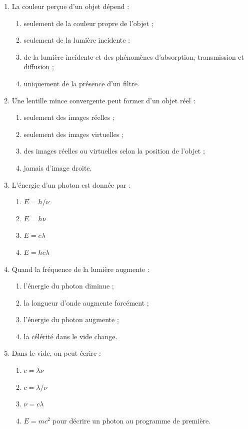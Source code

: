 \documentclass[11pt,a4paper]{article}
\begin{document}
\begin{enumerate}[label=\textbf{Q\arabic*.},leftmargin=1.1cm]
\item La couleur perçue d'un objet dépend :
\begin{enumerate}[label=\alph*)]
    \item seulement de la couleur propre de l'objet ;
    \item seulement de la lumière incidente ;
    \item de la lumière incidente et des phénomènes d'absorption, transmission et diffusion ;
    \item uniquement de la présence d'un filtre.
\end{enumerate}

\item Une lentille mince convergente peut former d'un objet réel :
\begin{enumerate}[label=\alph*)]
    \item seulement des images réelles ;
    \item seulement des images virtuelles ;
    \item des images réelles ou virtuelles selon la position de l'objet ;
    \item jamais d'image droite.
\end{enumerate}

\item L'énergie d'un photon est donnée par :
\begin{enumerate}[label=\alph*)]
    \item $E=h/\nu$
    \item $E=h\nu$
    \item $E=c\lambda$
    \item $E=hc\lambda$
\end{enumerate}

\item Quand la fréquence de la lumière augmente :
\begin{enumerate}[label=\alph*)]
    \item l'énergie du photon diminue ;
    \item la longueur d'onde augmente forcément ;
    \item l'énergie du photon augmente ;
    \item la célérité dans le vide change.
\end{enumerate}

\item Dans le vide, on peut écrire :
\begin{enumerate}[label=\alph*)]
    \item $c=\lambda\nu$
    \item $c=\lambda/\nu$
    \item $\nu = c\lambda$
    \item $E=mc^2$ pour décrire un photon au programme de première.
\end{enumerate}
\end{enumerate}
\end{document}
